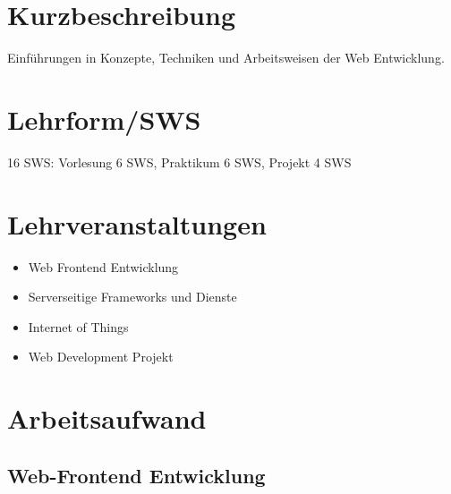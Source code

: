 \section*{Kurzbeschreibung\label{/mi-2017/modulbeschreibungen-bachelor/BA_Vertiefung-Web_Development}}\label{kurzbeschreibungpathlabelmi-2017modulbeschreibungen-bachelorbaux5fvertiefung-webux5fdevelopment}

Einführungen in Konzepte, Techniken und Arbeitsweisen der Web
Entwicklung.

\section*{Lehrform/SWS\label{/mi-2017/modulbeschreibungen-bachelor/BA_Vertiefung-Web_Development}}\label{lehrformswspathlabelmi-2017modulbeschreibungen-bachelorbaux5fvertiefung-webux5fdevelopment}

16 SWS: Vorlesung 6 SWS, Praktikum 6 SWS, Projekt 4 SWS

\section*{Lehrveranstaltungen\label{/mi-2017/modulbeschreibungen-bachelor/BA_Vertiefung-Web_Development}}\label{lehrveranstaltungenpathlabelmi-2017modulbeschreibungen-bachelorbaux5fvertiefung-webux5fdevelopment}

\begin{itemize}
\tightlist
\item
  Web Frontend Entwicklung
\item
  Serverseitige Frameworks und Dienste
\item
  Internet of Things
\item
  Web Development Projekt
\end{itemize}

\section*{Arbeitsaufwand\label{/mi-2017/modulbeschreibungen-bachelor/BA_Vertiefung-Web_Development}}\label{arbeitsaufwandpathlabelmi-2017modulbeschreibungen-bachelorbaux5fvertiefung-webux5fdevelopment}

\subsection*{Web-Frontend
Entwicklung\label{/mi-2017/modulbeschreibungen-bachelor/BA_Vertiefung-Web_Development}}\label{web-frontend-entwicklungpathlabelmi-2017modulbeschreibungen-bachelorbaux5fvertiefung-webux5fdevelopment}

